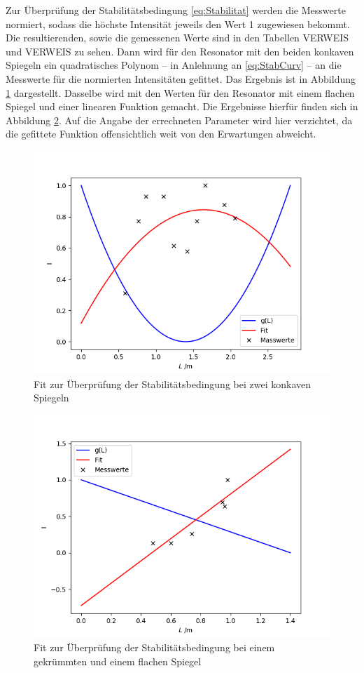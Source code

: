 Zur Überprüfung der Stabilitätsbedingung \eqref{eq:Stabilitat} werden die Messwerte normiert, sodass die höchste Intensität jeweils den Wert 1 zugewiesen bekommt. Die resultierenden, sowie die gemessenen Werte sind in den Tabellen VERWEIS und VERWEIS zu sehen. Dann wird für den Resonator mit den beiden konkaven Spiegeln ein quadratisches Polynom -- in Anlehnung an \eqref{eq:StabCurv} -- an die Messwerte für die normierten Intensitäten gefittet. Das Ergebnis ist in Abbildung \ref{fig:fitcurved} dargestellt. Dasselbe wird mit den Werten für den Resonator mit einem flachen Spiegel und einer linearen Funktion gemacht. Die Ergebnisse hierfür finden sich in Abbildung \ref{fig:fitflat}. Auf die Angabe der errechneten Parameter wird hier verzichtet, da die gefittete Funktion offensichtlich weit von den Erwartungen abweicht.
\begin{figure}[h!]
	\centering
	\includegraphics[width=.6\textwidth]{FitCurved.png}
	\caption{Fit zur Überprüfung der Stabilitätsbedingung bei zwei konkaven Spiegeln}
	\label{fig:fitcurved}
\end{figure}
\begin{figure}[h!]
	\centering
	\includegraphics[width=.6\textwidth]{FitFlat.png}
	\caption{Fit zur Überprüfung der Stabilitätsbedingung bei einem gekrümmten und einem flachen Spiegel}
	\label{fig:fitflat}
\end{figure}